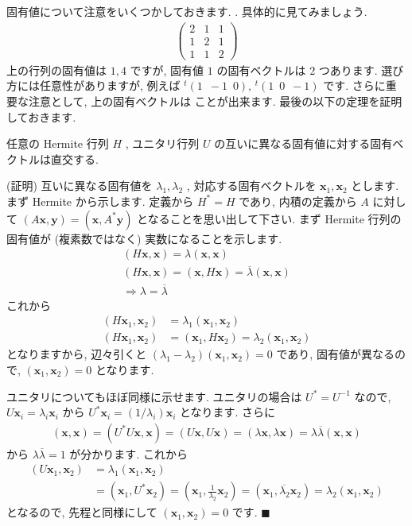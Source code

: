 \documentclass[openany, a4paper, oneside]{jsbook}
\begin{document}
固有値について注意をいくつかしておきます.
.
具体的に見てみましょう.
\begin{align}
    \begin{pmatrix} 2 & 1 & 1 \\
                    1 & 2 & 1 \\
                    1 & 1 & 2
    \end{pmatrix}
\end{align}
上の行列の固有値は $1,4$ ですが, 固有値 $1$ の固有ベクトルは $2$ つあります. 選び方には任意性がありますが,
例えば $^{t} (1 \,\,\, -1 \,\,\, 0 ),\,^{t}(1\,\,\,0 \,\,\, -1)$ です.
さらに重要な注意として, 上の固有ベクトルは
ことが出来ます.
最後の以下の定理を証明しておきます.
\begin{thm}
任意の Hermite 行列 $H$ , ユニタリ行列 $U$ の互いに異なる固有値に対する固有ベクトルは直交する.
\end{thm}
(証明)
互いに異なる固有値を $\lambda_1,\lambda_2$ , 対応する固有ベクトルを $\bm{x}_1,\bm{x}_2$ とします.
まず Hermite から示します.
定義から $H^* = H$ であり, 内積の定義から $A$ に対して $( A \bm{x} , \bm{y} ) = (  \bm{x} , A^* \bm{y} )$ となることを思い出して下さい.
まず Hermite 行列の固有値が (複素数ではなく) 実数になることを示します.
\begin{gather}
    ( H \bm{x} , \bm{x} )
    =
    \lambda ( \bm{x} , \bm{x} ) \\
    ( H \bm{x} , \bm{x} )
    =
    ( \bm{x} , H \bm{x} )
    =
    \overline{\lambda} ( \bm{x} , \bm{x} ) \\
    \Longrightarrow
    \lambda = \overline{\lambda}
\end{gather}
これから
\begin{align}
    ( H \bm{x}_1 , \bm{x}_2 )
    &=
    \lambda_1 ( \bm{x}_1, \bm{x}_2 ) \\
    ( H \bm{x}_1 , \bm{x}_2 )
    &=
    ( \bm{x}_1 , H \bm{x}_2 )
    =
    \lambda_2 ( \bm{x}_1, \bm{x}_2 )
\end{align}
となりますから, 辺々引くと $( \lambda_1 - \lambda_2 ) ( \bm{x}_1 , \bm{x}_2) = 0$ であり,
固有値が異なるので,  $( \bm{x}_1 , \bm{x}_2) = 0$ となります.

ユニタリについてもほぼ同様に示せます.
ユニタリの場合は $U^* = U^{-1}$ なので,  $U \bm{x}_i = \lambda_i \bm{x}_i$ から
 $U^* \bm{x}_i = ( 1 / \lambda _i) \bm{x}_i$ となります.
さらに
\begin{align}
    ( \bm{x} , \bm{x} )
    =
    ( U^* U \bm{x} , \bm{x} )
    =
    ( U \bm{x} , U \bm{x} )
    =
    ( \lambda \bm{x} , \lambda \bm{x} )
    =
    \lambda \overline{\lambda} ( \bm{x} , \bm{x} )
\end{align}
から $\lambda \overline{\lambda} = 1$ が分かります. これから
\begin{align}
    ( U \bm{x}_1 , \bm{x}_2 )
    &=
    \lambda_1 ( \bm{x}_1 , \bm{x}_2 ) \\
    &=
    ( \bm{x}_1 , U^* \bm{x}_2 )
    =
    ( \bm{x}_1 , \frac{1} {\lambda_2} \bm{x}_2 )
    =
    ( \bm{x}_1 , \overline{\lambda_2} \bm{x}_2 )
    =
    \lambda_2 ( \bm{x}_1 , \bm{x}_2 )
\end{align}
となるので, 先程と同様にして $( \bm{x}_1 , \bm{x}_2 ) = 0$ です.  $\blacksquare$
\end{document}
